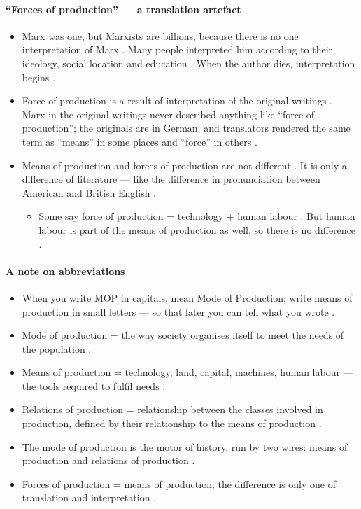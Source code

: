 \paragraph{``Forces of production'' --- a translation artefact}
\begin{itemize}
    \item Marx was one, but Marxists are billions, because there is no one interpretation of Marx . Many people interpreted him according to their ideology, social location and education . When the author dies, interpretation begins .
    \item Force of production is a result of interpretation of the original writings . Marx in the original writings never described anything like ``force of production''; the originals are in German, and translators rendered the same term as ``means'' in some places and ``force'' in others .
    \item Means of production and forces of production are not different . It is only a difference of literature --- like the difference in pronunciation between American and British English .
    \begin{itemize}
        \item Some say force of production = technology + human labour . But human labour is part of the means of production as well, so there is no difference .
    \end{itemize}
\end{itemize}

\paragraph{A note on abbreviations}
\begin{itemize}
    \item When you write MOP in capitals, mean Mode of Production; write means of production in small letters --- so that later you can tell what you wrote .
\end{itemize}

\begin{QuickRevision}
\begin{itemize}
    \item Mode of production = the way society organises itself to meet the needs of the population .
    \item Means of production = technology, land, capital, machines, human labour --- the tools required to fulfil needs .
    \item Relations of production = relationship between the classes involved in production, defined by their relationship to the means of production .
    \item The mode of production is the motor of history, run by two wires: means of production and relations of production .
    \item Forces of production = means of production; the difference is only one of translation and interpretation .
\end{itemize}
\end{QuickRevision}

